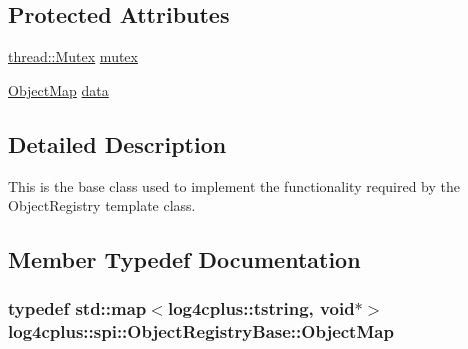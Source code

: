 \subsection*{Protected Attributes}
\begin{DoxyCompactItemize}
\item 
\hyperlink{classlog4cplus_1_1thread_1_1Mutex}{thread\-::\-Mutex} \hyperlink{classlog4cplus_1_1spi_1_1ObjectRegistryBase_a4f7217eb14db4173c87a450c5ab261df}{mutex}
\item 
\hyperlink{classlog4cplus_1_1spi_1_1ObjectRegistryBase_a5fe808425932ecd49349e063894dd3e6}{Object\-Map} \hyperlink{classlog4cplus_1_1spi_1_1ObjectRegistryBase_a037e65f8475b40a76a76ab931e7bc524}{data}
\end{DoxyCompactItemize}


\subsection{Detailed Description}
This is the base class used to implement the functionality required by the Object\-Registry template class. 

\subsection{Member Typedef Documentation}
\hypertarget{classlog4cplus_1_1spi_1_1ObjectRegistryBase_a5fe808425932ecd49349e063894dd3e6}{
\subsubsection[{Object\-Map}]{\setlength{\rightskip}{0pt plus 5cm}typedef std\-::map$<${\bf log4cplus\-::tstring}, void$\ast$$>$ {\bf log4cplus\-::spi\-::\-Object\-Registry\-Base\-::\-Object\-Map}\hspace{0.3cm}{\ttfamily [protected]}}}\label{classlog4cplus_1_1spi_1_1ObjectRegistryBase_a5fe808425932ecd49349e063894dd3e6}


